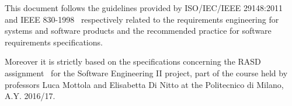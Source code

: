 This document follows the guidelines provided by ISO/IEC/IEEE 29148:2011~\cite{ieee-29148} and IEEE 830-1998~\cite{ieee-830} respectively related to the requirements engineering for systems and software products and the recommended practice for software requirements specifications.

Moreover it is strictly based on the specifications concerning the RASD assignment~\cite{se-assignments} for the Software Engineering II project, part of the course held by professors Luca Mottola and Elisabetta Di Nitto at the Politecnico di Milano, A.Y. 2016/17.